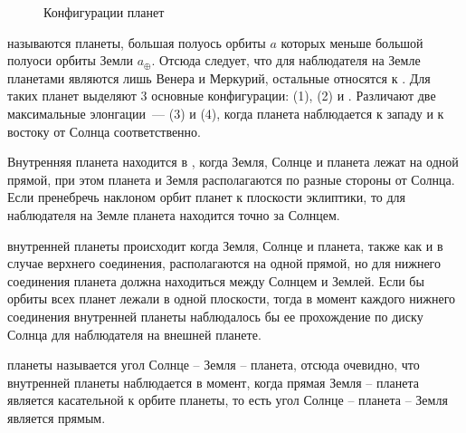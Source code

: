 \begin{figure}[h!]
{
}
\caption{Конфигурации планет}
\end{figure}

 называются планеты, большая полуось орбиты 
$a$ которых меньше большой полуоси орбиты Земли $a_\oplus$. Отсюда следует, что 
для наблюдателя на Земле  планетами являются лишь Венера 
и Меркурий, остальные относятся к . Для таких планет выделяют 
3 основные конфигурации:  (1),  (2) и . Различают две максимальные 
элонгации~---  (3) и  (4), когда планета 
наблюдается к западу и к востоку от Солнца соответственно.

Внутренняя планета находится в , когда Земля, 
Солнце и планета лежат на одной прямой, при этом планета и Земля располагаются 
по разные стороны от Солнца. Если пренебречь наклоном орбит планет к плоскости 
эклиптики, то для наблюдателя на Земле планета находится точно за Солнцем.

 внутренней планеты происходит когда Земля, Солнце 
и планета, также как и в случае верхнего соединения, располагаются на одной 
прямой, но для нижнего соединения планета должна находиться между Солнцем и 
Землей. Если бы орбиты всех планет лежали в одной плоскости, тогда в момент 
каждого нижнего соединения внутренней планеты наблюдалось бы ее прохождение по 
диску Солнца для наблюдателя на внешней планете.

 планеты называется угол Солнце -- Земля -- планета, 
отсюда очевидно, что  внутренней планеты 
наблюдается в момент, когда прямая Земля -- планета является касательной к 
орбите планеты, то есть угол Солнце -- планета -- Земля является прямым.\\

